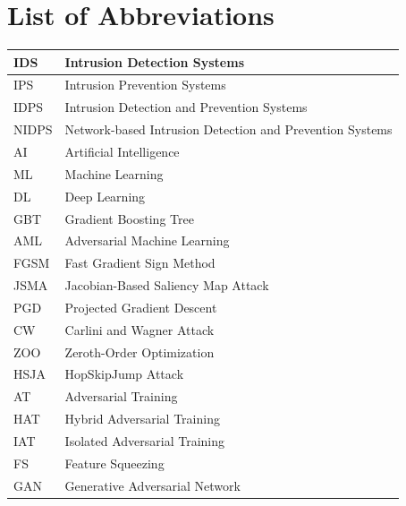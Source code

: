 \documentclass[12pt, a4paper, reqno, oneside]{book}
\begin{document}
\newpage
\listoftables
\begingroup
\listofalgorithms
\let\clearpage\relax
\endgroup

\newpage
\chapter*{List of Abbreviations}
\vspace{20pt}

\begin{table}[H]
\centering
\begin{tabular}{|m{2cm}|m{8cm}|}
\hline
IDS & Intrusion Detection Systems \\ \hline

IPS & Intrusion Prevention Systems \\ \hline

IDPS & Intrusion Detection and Prevention Systems \\ \hline

NIDPS & Network-based Intrusion Detection and Prevention Systems \\ \hline

AI & Artificial Intelligence \\ \hline

ML & Machine Learning \\ \hline

DL & Deep Learning \\ \hline

GBT & Gradient Boosting Tree \\ \hline

AML & Adversarial Machine Learning \\ \hline


FGSM & Fast Gradient Sign Method \\ \hline

JSMA & Jacobian-Based Saliency Map Attack \\ \hline

PGD & Projected Gradient Descent \\ \hline

CW & Carlini and Wagner Attack \\ \hline

ZOO & Zeroth-Order Optimization \\ \hline

HSJA & HopSkipJump Attack \\ \hline

AT & Adversarial Training \\ \hline

HAT & Hybrid Adversarial Training \\ \hline

IAT & Isolated Adversarial Training \\ \hline

FS & Feature Squeezing \\ \hline

GAN & Generative Adversarial Network \\ \hline
\end{tabular}
\end{table}
\end{document}
